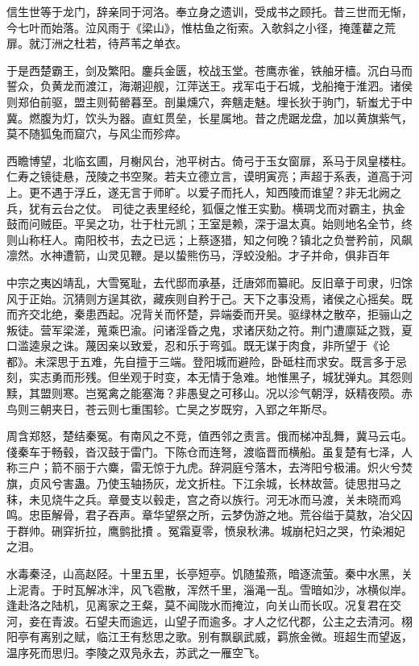 信生世等于龙门，辞亲同于河洛。奉立身之遗训，受成书之顾托。昔三世而无惭，今七叶而始落。泣风雨于《梁山》，惟枯鱼之衔索。入欹斜之小径，掩蓬藋之荒扉。就汀洲之杜若，待芦苇之单衣。

于是西楚霸王，剑及繁阳。鏖兵金匮，校战玉堂。苍鹰赤雀，铁舳牙樯。沉白马而誓众，负黄龙而渡江，海潮迎舰，江萍送王。戎军屯于石城，戈船掩于淮泗。诸侯则郑伯前驱，盟主则荀罃暮至。剖巢燻穴，奔魑走魅。埋长狄于驹门，斩蚩尤于中冀。燃腹为灯，饮头为器。直虹贯垒，长星属地。昔之虎踞龙盘，加以黄旗紫气，莫不随狐兔而窟穴，与风尘而殄瘁。

西瞻博望，北临玄圃，月榭风台，池平树古。倚弓于玉女窗扉，系马于凤皇楼柱。仁寿之镜徒悬，茂陵之书空聚。若夫立德立言，谟明寅亮；声超于系表，道高于河上。更不遇于浮丘，遂无言于师旷。以爱子而托人，知西陵而谁望？非无北阙之兵，犹有云台之仗。 司徒之表里经纶，狐偃之惟王实勤。横琱戈而对霸主，执金鼓而问贼臣。平吴之功，壮于杜元凯；王室是赖，深于温太真。始则地名全节，终则山称枉人。南阳校书，去之已远；上蔡逐猎，知之何晚？镇北之负誉矜前，风飙凛然。水神遭箭，山灵见鞭。是以蛰熊伤马，浮蛟没船。才子并命，俱非百年

中宗之夷凶靖乱，大雪冤耻，去代邸而承基，迁唐郊而纂祀。反旧章于司隶，归馀风于正始。沉猜则方逞其欲，藏疾则自矜于己。天下之事没焉，诸侯之心摇矣。既而齐交北绝，秦患西起。况背关而怀楚，异端委而开吴。驱绿林之散卒，拒骊山之叛徒。营军梁溠，蒐乘巴渝。问诸淫昏之鬼，求诸厌劾之符。荆门遭廪延之戮，夏口滥逵泉之诛。蔑因亲以致爱，忍和乐于弯弧。既无谋于肉食，非所望于《论都》。未深思于五难，先自擅于三端。登阳城而避险，卧砥柱而求安。既言多于忌刻，实志勇而形残。但坐观于时变，本无情于急难。地惟黑子，城犹弹丸。其怨则黩，其盟则寒。岂冤禽之能塞海？非愚叟之可移山。况以沴气朝浮，妖精夜陨。赤鸟则三朝夹日，苍云则七重围轸。亡吴之岁既穷，入郢之年斯尽。

周含郑怒，楚结秦冤。有南风之不竞，值西邻之责言。俄而梯冲乱舞，冀马云屯。俴秦车于畅毂，沓汉鼓于雷门。下陈仓而连弩，渡临晋而横船。虽复楚有七泽，人称三户；箭不丽于六麋，雷无惊于九虎。辞洞庭兮落木，去涔阳兮极浦。炽火兮焚旗，贞风兮害蛊。乃使玉轴扬灰，龙文折柱。下江余城，长林故营。徒思拑马之秣，未见烧牛之兵。章曼支以毂走，宫之奇以族行。河无冰而马渡，关未晓而鸡鸣。忠臣解骨，君子吞声。章华望祭之所，云梦伪游之地。荒谷缢于莫敖，冶父囚于群帅。硎穽折拉，鹰鹯批㩌 。冤霜夏零，愤泉秋沸。城崩杞妇之哭，竹染湘妃之泪。

水毒秦泾，山高赵陉。十里五里，长亭短亭。饥随蛰燕，暗逐流萤。秦中水黑，关上泥青。于时瓦解冰泮，风飞雹散，浑然千里，淄渑一乱。雪暗如沙，冰横似岸。逢赴洛之陆机，见离家之王粲，莫不闻陇水而掩泣，向关山而长叹。况复君在交河，妾在青波。石望夫而逾远，山望子而逾多。才人之忆代郡，公主之去清河。栩阳亭有离别之赋，临江王有愁思之歌。别有飘飖武威，羁旅金微。班超生而望返，温序死而思归。李陵之双凫永去，苏武之一雁空飞。

